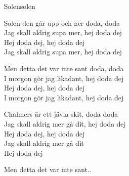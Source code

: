 \begin{song}{Solen}{solen}
\begin{vers}
Solen den går upp och ner doda, doda\\
Jag skall aldrig supa mer, hej doda dej\\
Hej doda dej, hej doda dej\\
Jag skall aldrig supa mer, hej doda dej\\
\end{vers}
\begin{vers}
Men detta det var inte sant doda, doda\\
I morgon gör jag likadant, hej doda dej\\
Hej doda dej, hej doda dej\\
I morgon gör jag likadant, hej doda dej\\
\end{vers}
\begin{vers}
Chalmers är ett jävla skit, doda doda\\
Jag skall aldrig mer gå dit, hej doda dej\\
Hej doda dej, hej doda dej\\
Jag skall aldrig mer gå dit\\
Hej doda dej\\
\end{vers}
\begin{vers}
Men detta det var inte sant..\\
\end{vers}
\end{song}
